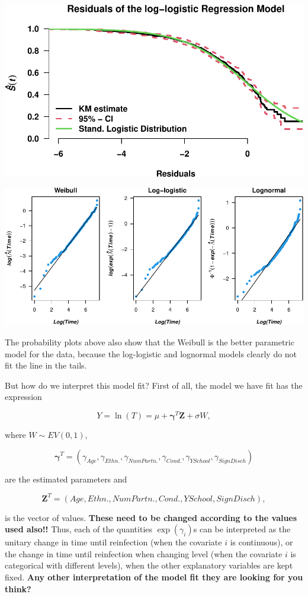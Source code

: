 \documentclass[
]{article}
\begin{document}
\includegraphics{practical_files/figure-latex/fit-loglog-1.pdf}

\includegraphics{practical_files/figure-latex/cumhaz-plot-1.pdf}

The probability plots above also show that the Weibull is the better parametric model for the data, because the log-logistic and lognormal models clearly do not fit the line in the tails.

But how do we interpret this model fit? First of all, the model we have fit has the expression

\[
Y = \ln(T) = \mu + \mathbf{\gamma}^T\mathbf{Z} + \sigma W,  
\]

where \(W \sim EV(0,1)\),

\[
\mathbf{\gamma}^T = (\gamma_{Age}, \gamma_{Ethn.}, \gamma_{NumPartn.}, \gamma_{Cond.}, \gamma_{YSchool}, \gamma_{SignDisch}) 
\]

are the estimated parameters and

\[
\mathbf{Z}^T = (Age, Ethn., NumPartn., Cond., YSchool, SignDisch), 
\]

is the vector of values. \textbf{These need to be changed according to the values used also!!} Thus, each of the quantities \(\exp(\gamma_i)\)s can be interpreted as the unitary change in time until reinfection (when the covariate \(i\) is continuous), or the change in time until reinfection when changing level (when the covariate \(i\) is categorical with different levels), when the other explanatory variables are kept fixed. \textbf{Any other interpretation of the model fit they are looking for you think?}
\end{document}
